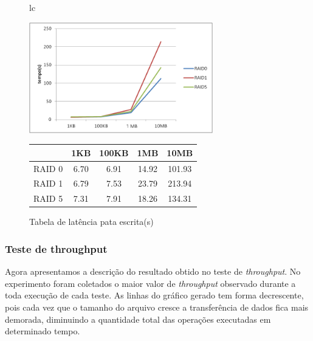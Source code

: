 	\begin{figure}[h]
		\begin{tabular}{lc}
			\begin{minipage}{.50\textwidth}
				\begin{center}
					
					\includegraphics[clip,width=8.0cm]{images/resultados/latencia_escrita.png}
					\caption{Gráfico de latência pata escrita}
					\label{fig:latencia_e}
					
				\end{center}
				
			\end{minipage}
			
			\begin{minipage}{.5\textwidth}
				\makeatletter
				\def\@captype{table}
				\makeatother
				\caption{Tabela de latência pata escrita(s)}
				\label{tab:latencia_e}
				\begin{center}
					\begin{tabular}{|c|c|c|c|c|} \hline
								& 1KB  & 100KB & 1MB   & 10MB \\ \hline
						RAID 0	& 6.70 & 6.91 & 14.92 & 101.93\\ \hline
						RAID 1	& 6.79 & 7.53 & 23.79 & 213.94\\ \hline
						RAID 5	& 7.31 & 7.91 & 18.26 & 134.31\\ \hline
						
					\end{tabular}
					
				\end{center}
			\end{minipage}
		\end{tabular}
	\end{figure}
	
	\subsubsection{Teste de throughput}
	Agora apresentamos a descrição do resultado obtido no teste de \textit{throughput}.
	No experimento foram coletados o maior valor de \textit{throughput} observado durante a toda execução de cada teste.
	As linhas do gráfico gerado tem forma decrescente, pois cada vez que o tamanho do arquivo cresce a transferência de dados fica mais demorada, diminuindo a quantidade total das operações executadas em determinado tempo.
	\\
	 
